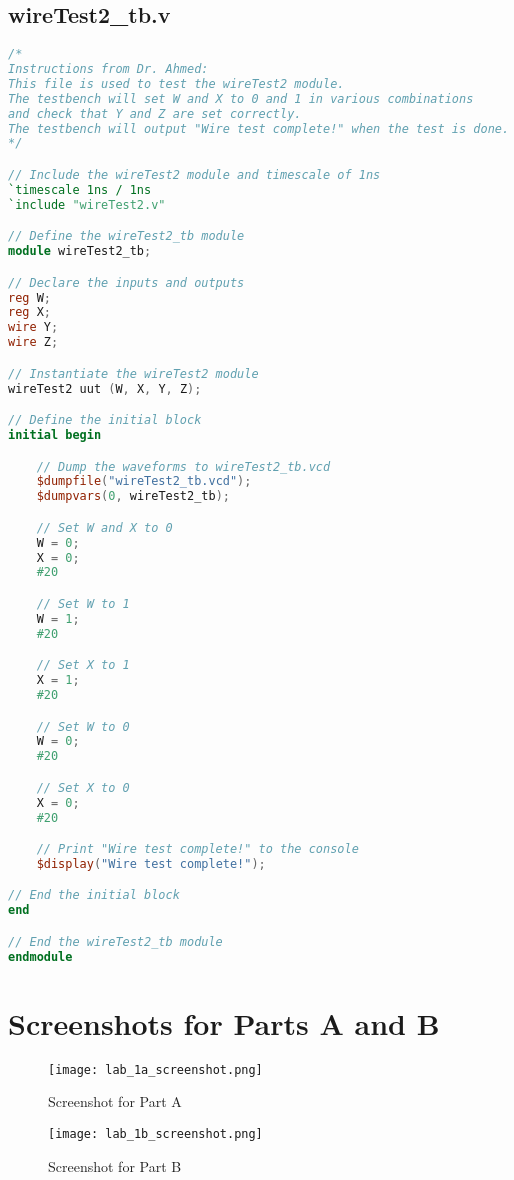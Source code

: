 \documentclass[a4paper,12pt]{article}
\begin{document}
\subsection*{wireTest2\_tb.v}
\begin{lstlisting}[language=Verilog, caption=wireTest2_tb.v]
/*
Instructions from Dr. Ahmed:
This file is used to test the wireTest2 module.
The testbench will set W and X to 0 and 1 in various combinations
and check that Y and Z are set correctly.
The testbench will output "Wire test complete!" when the test is done.
*/

// Include the wireTest2 module and timescale of 1ns
`timescale 1ns / 1ns
`include "wireTest2.v"

// Define the wireTest2_tb module
module wireTest2_tb;

// Declare the inputs and outputs
reg W;
reg X;
wire Y;
wire Z;

// Instantiate the wireTest2 module
wireTest2 uut (W, X, Y, Z);

// Define the initial block
initial begin

    // Dump the waveforms to wireTest2_tb.vcd
    $dumpfile("wireTest2_tb.vcd");
    $dumpvars(0, wireTest2_tb);

    // Set W and X to 0
    W = 0;
    X = 0;
    #20

    // Set W to 1
    W = 1;
    #20

    // Set X to 1
    X = 1;
    #20

    // Set W to 0
    W = 0;
    #20

    // Set X to 0
    X = 0;
    #20

    // Print "Wire test complete!" to the console
    $display("Wire test complete!");

// End the initial block
end

// End the wireTest2_tb module
endmodule
\end{lstlisting}

\newpage

\section*{Screenshots for Parts A and B}
\begin{figure}[h]
    \centering
    \texttt{[image: lab\_1a\_screenshot.png]} %
    \caption{Screenshot for Part A}
\end{figure}

\begin{figure}[h]
    \centering
    \texttt{[image: lab\_1b\_screenshot.png]} %
    \caption{Screenshot for Part B}
\end{figure}
\end{document}
